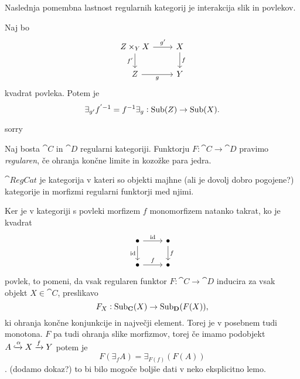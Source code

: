 \documentclass[../kategoricna_logika.tex]{subfiles}
\begin{document}
Naslednja pomembna lastnost regularnih kategorij je interakcija slik in povlekov.
\begin{lema}
  Naj bo
  \begin{equation*}
    \begin{tikzcd}
      Z \times_Y X \ar[d, "f'"'] \ar[r, "g'"] & X \ar[d, "f"] \\
      Z \ar[r, "g"'] & Y
    \end{tikzcd}
  \end{equation*}
  kvadrat povleka. Potem je
  $$\exists_{g'}f^{'-1} = f^{-1}\exists_g : \operatorname{Sub}(Z) \to \operatorname{Sub}(X).$$
\end{lema}
\begin{dokaz}
  sorry
\end{dokaz}
\begin{definicija}
  Naj bosta $\cat{C}$ in $\cat{D}$ regularni kategoriji. Funktorju $F : \cat{C} \to \cat{D}$ pravimo \emph{regularen}, če ohranja končne limite in kozožke para jedra.
\end{definicija}
\begin{definicija}
  $\cat{RegCat}$ je kategorija v kateri so objekti majhne (ali je dovolj dobro pogojene?) kategorije in morfizmi regularni funktorji med njimi.
\end{definicija}

Ker je v kategoriji s povleki morfizem $f$ monomorfizem natanko takrat, ko je kvadrat
\begin{equation*}
  \begin{tikzcd}
    \bullet \ar[d, "\mathrm{id}"'] \ar[r, "\mathrm{id}"] & \bullet \ar[d, "f"] \\
    \bullet \ar[r, "f"] & \bullet
  \end{tikzcd}
\end{equation*}
povlek, to pomeni, da vsak regularen funktor $F : \cat{C} \to \cat{D}$ inducira za vsak objekt $X \in \cat{C}$, preslikavo
$$F_X : \operatorname{Sub}_{\operatorname{\mathbf{C}}}(X) \to \operatorname{Sub}_{\operatorname{\mathbf{D}}}(F(X)),$$
ki ohranja končne konjunkcije in največji element. Torej je v posebnem tudi monotona. $F$ pa tudi ohranja slike morfizmov, torej če imamo podobjekt $A \xhookrightarrow{\alpha} X \xrightarrow{f} Y$ potem je 
$$F(\exists_f A) = \exists_{F(f)}(F(A))$$.
(dodamo dokaz?)
to bi bilo mogoče boljše dati v neko eksplicitno lemo.
%
\end{document}
